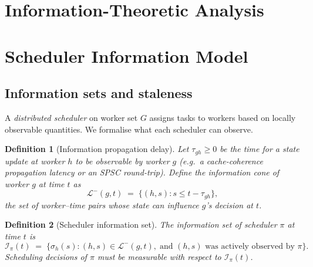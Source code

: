 \documentclass[11pt,a4paper]{article}
\newtheorem{definition}{Definition}[section]
\begin{document}
\section*{Information-Theoretic Analysis}
\label{chap:info_theory}
\setcounter{section}{0}

\section{Scheduler Information Model}
\label{sec:info_model}

\subsection{Information sets and staleness}

A \emph{distributed scheduler} on worker set $G$ assigns tasks to workers
based on locally observable quantities.  We formalise what each scheduler
can observe.

\begin{definition}[Information propagation delay]\label{def:tau}
Let $\tau_{gh} \geq 0$ be the time for a state update at worker $h$ to be
observable by worker $g$ (e.g.\ a cache-coherence propagation latency
or an SPSC round-trip).  Define the \emph{information cone} of worker $g$
at time $t$ as
\[
  \mathcal{L}^-(g,t)
  \;=\;
  \bigl\{(h,s) : s \leq t - \tau_{gh}\bigr\},
\]
the set of worker--time pairs whose state can influence $g$'s decision at $t$.
\end{definition}

\begin{definition}[Scheduler information set]\label{def:info_set}
The \emph{information set} of scheduler $\pi$ at time $t$ is
\[
  \mathcal{I}_\pi(t)
  \;=\;
  \bigl\{\sigma_h(s) : (h,s) \in \mathcal{L}^-(g,t),\;
         \text{and } (h,s) \text{ was actively observed by } \pi\bigr\}.
\]
Scheduling decisions of $\pi$ must be measurable with respect to
$\mathcal{I}_\pi(t)$.
\end{definition}
\end{document}

